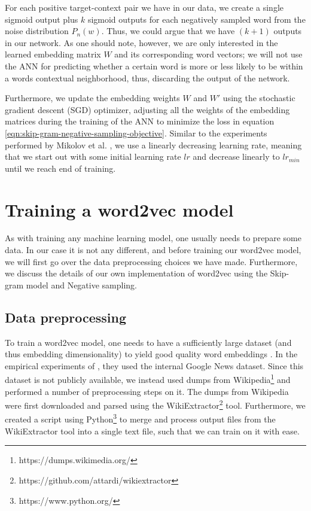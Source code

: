 \noindent
For each positive target-context pair we have in our data, we create a single sigmoid output plus $k$ sigmoid outputs for each negatively sampled word from the noise distribution $P_n(w)$. Thus, we could argue that we have $(k + 1)$ outputs in our network. As one should note, however, we are only interested in the learned embedding matrix $W$ and its corresponding word vectors; we will not use the ANN for predicting whether a certain word is more or less likely to be within a words contextual neighborhood, thus, discarding the output of the network.

\noindent
Furthermore, we update the embedding weights $W$ and $W'$ using the stochastic gradient descent (SGD) optimizer, adjusting all the weights of the embedding matrices during the training of the ANN to minimize the loss in equation \ref{eqn:skip-gram-negative-sampling-objective}. Similar to the experiments performed by Mikolov et al. \cite{mikolov2013a}, we use a linearly decreasing learning rate, meaning that we start out with some initial learning rate $lr$ and decrease linearly to $lr_{min}$ until we reach end of training.

\section{Training a word2vec model}
As with training any machine learning model, one usually needs to prepare some data. In our case it is not any different, and before training our word2vec model, we will first go over the data preprocessing choices we have made. Furthermore, we discuss the details of our own implementation of word2vec using the Skip-gram model and Negative sampling.

\subsection{Data preprocessing}
To train a word2vec model, one needs to have a sufficiently large dataset (and thus embedding dimensionality) to yield good quality word embeddings \cite{mikolov2013b}. In the empirical experiments of \cite{mikolov2013b}, they used the internal Google News dataset. Since this dataset is not publicly available, we instead used dumps from Wikipedia\footnote{https://dumps.wikimedia.org/} and performed a number of preprocessing steps on it. The dumps from Wikipedia were first downloaded and parsed using the WikiExtractor\footnote{https://github.com/attardi/wikiextractor} tool. Furthermore, we created a script using Python\footnote{https://www.python.org/} to merge and process output files from the WikiExtractor tool into a single text file, such that we can train on it with ease.

